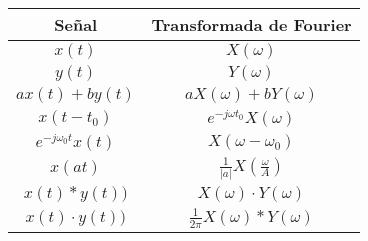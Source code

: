 \documentclass[es]{article}
\begin{document}
\begin{center}
\begin{tabular}{|c|c|}
        \hline
        {\bf Señal} & {\bf Transformada de Fourier} \\
        \hline
        $x(t)$ & $X(\omega)$ \\
        \hline
        $y(t)$ & $Y(\omega)$ \\
        \hline
        $a x(t) + b y(t) $ & $a X(\omega) + b Y(\omega)$ \\
        \hline
        $x(t-t_0)$ & $e^{-j \omega t_0} X(\omega)$ \\
        \hline
        $e^{-j\omega_0 t} x(t)$ & $X(\omega - \omega_0)$ \\
        \hline
        $x(at)$ & $\displaystyle\frac{1}{|a|}X \left ( \displaystyle\frac{\omega}{A} \right )$ \\
        \hline
        $x(t) \ast y(t))$ & $X(\omega) \cdot Y(\omega)$ \\
        \hline
        $x(t) \cdot y(t))$ & $\displaystyle\frac{1}{2\pi} X(\omega) \ast Y(\omega)$ \\
        \hline
    \end{tabular}
    \renewcommand{\arraystretch}{1}
    \vspace{0.5cm}



\end{center}
\end{document}
